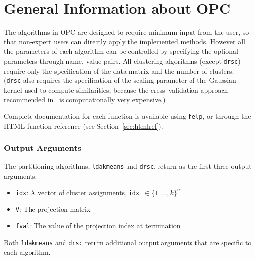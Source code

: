 \documentclass{book}
\begin{document}

\chapter{General Information about OPC}

The algorithms in OPC are designed to require minimum input from the user, so
that non-expert users can directly apply the implemented methods. However all
the parameters of each algorithm can be controlled by specifying
the optional parameters through name, value pairs.
%
All clustering algorithms (except {\tt drsc}) require only the specification
of the data matrix and the number of clusters. ({\tt drsc} also requires
the specification of the scaling parameter of the Gaussian kernel used
to compute similarities, because the
cross--validation approach recommended in~\cite{NiuDJ2011}
is computationally very expensive.)

\noindent
Complete documentation for each function is available using {\tt help},
or through the HTML function reference (see Section~\ref{sec:htmlref}).

%

%
%
%
\subsection*{Output Arguments}

The partitioning algorithms, {\tt ldakmeans} and {\tt drsc}, return as the
first three output arguments:
%
\begin{itemize}

\item[] {\tt idx}: A vector of cluster assignments, {\tt idx}~$\in \{1,\ldots,k\}^n$

\item[] {\tt V}: The projection matrix

\item[] {\tt fval}: The value of the projection index at termination 

\end{itemize}
%
Both {\tt ldakmeans} and {\tt drsc} return additional output arguments that are
specific to each algorithm.
\end{document}
